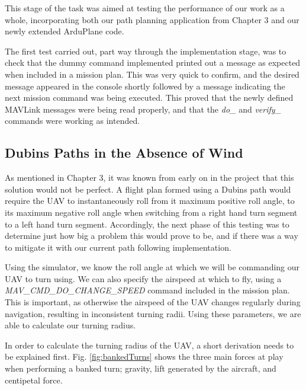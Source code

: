 This stage of the task was aimed at testing the performance of our work as a whole, incorporating both our path planning application from Chapter 3 and our newly extended ArduPlane code. 

The first test carried out, part way through the implementation stage, was to check that the dummy command implemented printed out a message as expected when included in a mission plan. This was very quick to confirm, and the desired message appeared in the console shortly followed by a message indicating the next mission command was being executed. This proved that the newly defined MAVLink messages were being read properly, and that the \textit{do\_} and \textit{verify\_} commands were working as intended.

\subsection{Dubins Paths in the Absence of Wind}
\label{task2:nowind}

As mentioned in Chapter 3, it was known from early on in the project that this solution would not be perfect. A flight plan formed using a Dubins path would require the UAV to instantaneously roll from it maximum positive roll angle, to its maximum negative roll angle when switching from a right hand turn segment to a left hand turn segment. Accordingly, the next phase of this testing was to determine just how big a problem this would prove to be, and if there was a way to mitigate it with our current path following implementation. 

Using the simulator, we know the roll angle at which we will be commanding our UAV to turn using. We can also specify the airspeed at which to fly, using a \textit{MAV\_CMD\_DO\_CHANGE\_SPEED} command included in the mission plan. This is important, as otherwise the airspeed of the UAV changes regularly during navigation, resulting in inconsistent turning radii. Using these parameters, we are able to calculate our turning radius.


In order to calculate the turning radius of the UAV, a short derivation needs to be explained first. Fig. \ref{fig:bankedTurns} shows the three main forces at play when performing a banked turn; gravity, lift generated by the aircraft, and centipetal force. %

